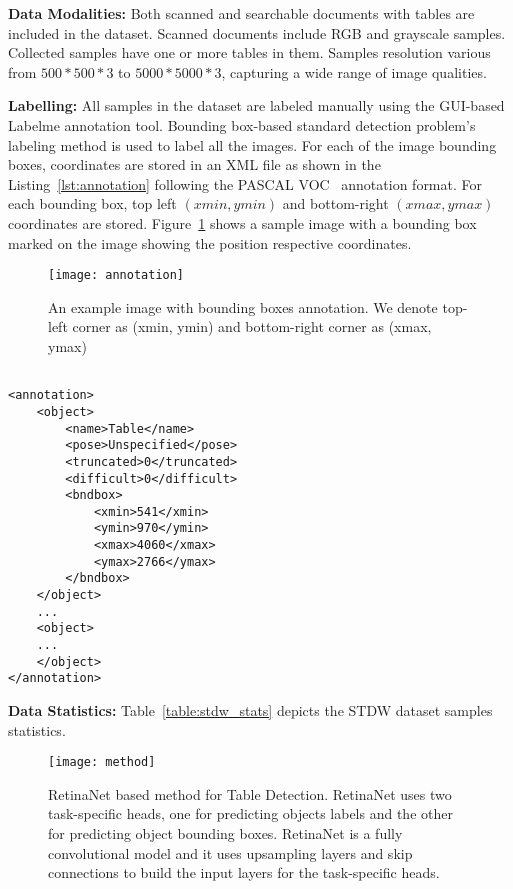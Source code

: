 \documentclass[a4paper,conference]{IEEEtran}
\begin{document}
\textbf{Data Modalities:} Both scanned and searchable documents with tables are included in the dataset. Scanned documents include RGB and grayscale samples. Collected samples have one or more tables in them. Samples resolution various from $500 * 500 * 3$ to $5000 * 5000 * 3$, capturing a wide range of image qualities. 

\textbf{Labelling:} All samples in the dataset are labeled manually using the GUI-based Labelme \cite{labelme} annotation tool. Bounding box-based standard detection problem's labeling method is used to label all the images. For each of the image bounding boxes, coordinates are stored in an XML file as shown in the Listing~\ref{lst:annotation} following the PASCAL VOC~\cite{pascal_voc} annotation format.
For each bounding box, top left $(xmin, ymin)$ and bottom-right $(xmax, ymax)$ coordinates are stored. Figure~\ref{fig:annotation} shows a sample image with a bounding box marked on the image showing the position respective coordinates.

\begin{figure}
  \centering
      \texttt{[image: annotation]}
\caption{An example image with bounding boxes annotation. We denote top-left corner as (xmin, ymin) and bottom-right corner as (xmax, ymax)}
\label{fig:annotation}
\end{figure}

\begin{lstlisting}[float,caption=An example XML file content showing the annotation for a single bounding box.,label=lst:annotation]

<annotation>
	<object>
		<name>Table</name>
		<pose>Unspecified</pose>
		<truncated>0</truncated>
		<difficult>0</difficult>
		<bndbox>
			<xmin>541</xmin>
			<ymin>970</ymin>
			<xmax>4060</xmax>
			<ymax>2766</ymax>
		</bndbox>
	</object>
	...
	<object>
	...
	</object>
</annotation>
\end{lstlisting}





\textbf{Data Statistics:}
Table~\ref{table:stdw_stats} depicts the STDW dataset samples statistics. 


\begin{figure*}
  \centering
      \texttt{[image: method]}
\caption{RetinaNet based method for Table Detection. RetinaNet uses two task-specific heads, one for predicting objects labels and the other for predicting object bounding boxes.  RetinaNet is a fully convolutional model and it uses upsampling layers and skip connections to build the input layers for the task-specific heads.}
\label{fig:method}
\end{figure*}
\end{document}
